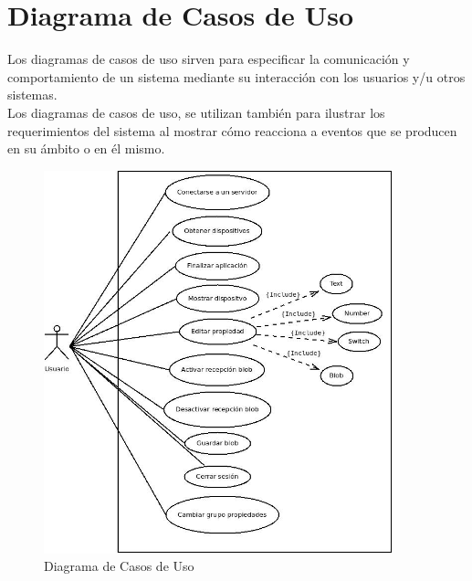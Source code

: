 \section{Diagrama de Casos de Uso}
Los diagramas de casos de uso sirven para especificar la comunicación y comportamiento de un sistema mediante su interacción con los usuarios y/u otros sistemas.\\
Los diagramas de casos de uso, se utilizan también para ilustrar los requerimientos del sistema al mostrar cómo reacciona a eventos que se producen en su ámbito o en él mismo.\cite{CasosUso}

\begin{figure}[htb]
\centering
\includegraphics[width=0.9\textwidth]{./imagenes/DiagramaCasosUsoFinal}
\caption{Diagrama de Casos de Uso} \label{fig:DiagramaCasosUsoFinal}
\end{figure}
